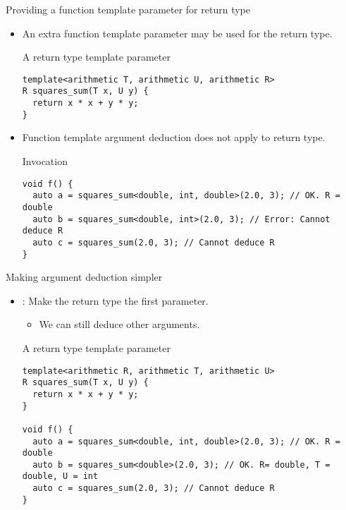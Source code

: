 \begin{frame}[t,fragile]{Providing a function template parameter for return type}

\begin{itemize}
  \item An extra function template parameter may be used for the return type.

\begin{block}{A return type template parameter}
\begin{lstlisting}
template<arithmetic T, arithmetic U, arithmetic R>
R squares_sum(T x, U y) {
  return x * x + y * y;
}
\end{lstlisting}
\end{block}

  \item Function template argument deduction does not apply to return type.

\begin{block}{Invocation}
\begin{lstlisting}
void f() {
  auto a = squares_sum<double, int, double>(2.0, 3); // OK. R = double
  auto b = squares_sum<double, int>(2.0, 3); // Error: Cannot deduce R
  auto c = squares_sum(2.0, 3); // Cannot deduce R
}
\end{lstlisting}
\end{block}

\end{itemize}
\end{frame}

\begin{frame}[t,fragile]{Making argument deduction simpler}
\begin{itemize}
  \item {}: Make the return type the first parameter.
    \begin{itemize}
      \item We can still deduce other arguments.
    \end{itemize}
\begin{block}{A return type template parameter}
\begin{lstlisting}
template<arithmetic R, arithmetic T, arithmetic U>
R squares_sum(T x, U y) {
  return x * x + y * y;
}

void f() {
  auto a = squares_sum<double, int, double>(2.0, 3); // OK. R = double
  auto b = squares_sum<double>(2.0, 3); // OK. R= double, T = double, U = int
  auto c = squares_sum(2.0, 3); // Cannot deduce R
}
\end{lstlisting}
\end{block}

\end{itemize}
\end{frame}
